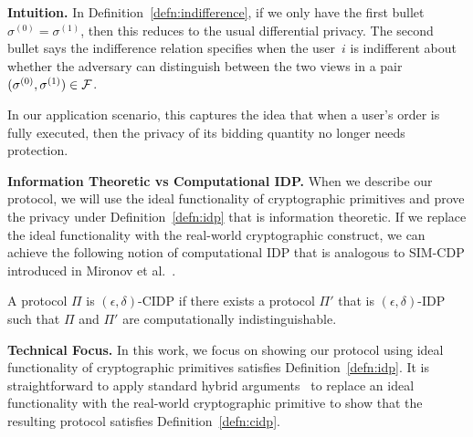 \noindent \textbf{Intuition.}
In Definition~\ref{defn:indifference},
if we only have the first bullet $\sigma^{(0)} = \sigma^{(1)}$,
then this reduces to the usual differential privacy.
The second bullet says the indifference relation specifies when 
the user~$i$ is indifferent
about whether the adversary can distinguish between the 
two views in a pair $(\sigma^{(0)}, \sigma^{(1)}) \in \mathcal {F}$.

In our application scenario, this captures the idea
that when a user's order is fully executed, then the privacy of its bidding quantity
no longer needs protection.



\noindent \textbf{Information Theoretic vs Computational IDP.}
When we describe our protocol,
we will use the ideal functionality of cryptographic
primitives and prove the privacy under
Definition~\ref{defn:idp} that is information theoretic.
If we replace the ideal functionality with
the real-world cryptographic construct,
we can achieve the following notion of
computational IDP that is analogous to SIM-CDP 
introduced in Mironov et al.~\cite{DBLP:conf/crypto/MironovPRV09}.

\begin{definition}
\label{defn:cidp}
A protocol $\Pi$ is $(\epsilon, \delta)$-CIDP
if there exists a protocol $\Pi'$ that
is $(\epsilon, \delta)$-IDP such that
$\Pi$ and $\Pi'$ are computationally indistinguishable.
\end{definition}

\noindent \textbf{Technical Focus.}
In this work, we focus on showing
our protocol using ideal functionality of cryptographic primitives satisfies Definition~\ref{defn:idp}.
It is straightforward to apply standard hybrid arguments~\cite{DBLP:conf/crypto/MironovPRV09}
to replace an ideal functionality with the real-world cryptographic
primitive to show that the resulting protocol
satisfies Definition~\ref{defn:cidp}.




